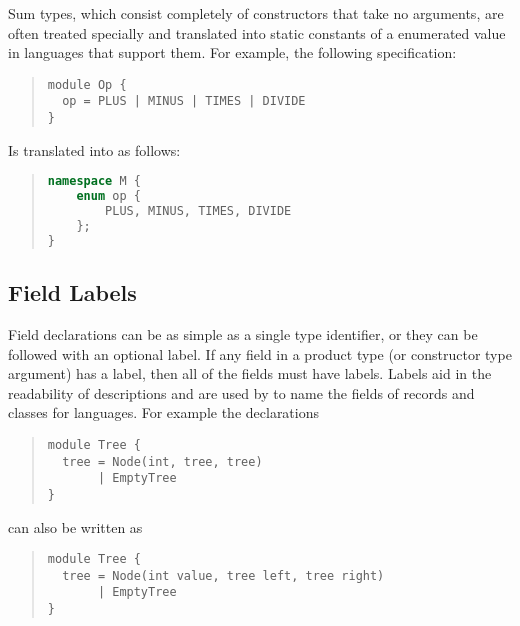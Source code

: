 Sum types, which consist completely of constructors that take no arguments,
are often treated specially and translated into static constants of a
enumerated value in languages that support them.
For example, the following \asdl{} specification:
%
\begin{quote}\begin{lstlisting}[language=ASDL]
module Op {
  op = PLUS | MINUS | TIMES | DIVIDE 
}
\end{lstlisting}\end{quote}%
%
Is translated into \Cplusplus{} as follows:
%
\begin{quote}\begin{lstlisting}[language=c++]
namespace M {
    enum op {
        PLUS, MINUS, TIMES, DIVIDE
    };
}
\end{lstlisting}\end{quote}%

\subsection{Field Labels}
Field declarations can be as simple as a single type identifier, or they can
be followed with an optional label.
If any field in a product type (or constructor type argument) has a label, then
all of the fields must have labels.
Labels aid in the readability of
descriptions and are used by \asdlgen{} to name the fields of records
and classes for languages.
For example the declarations
\begin{quote}\begin{lstlisting}[language=ASDL]
module Tree {
  tree = Node(int, tree, tree)
       | EmptyTree
}
\end{lstlisting}\end{quote}%
can also be written as
\begin{quote}\begin{lstlisting}[language=ASDL]
module Tree {
  tree = Node(int value, tree left, tree right)
       | EmptyTree
}
\end{lstlisting}\end{quote}%

